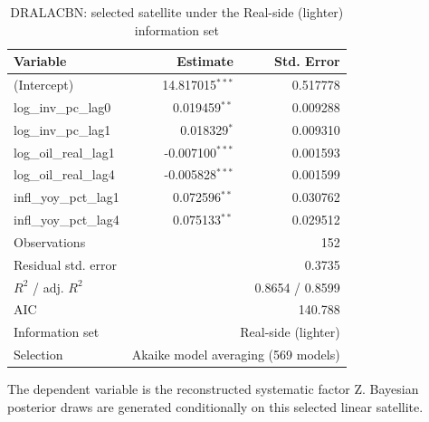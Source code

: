 \begin{table}[!htbp]
\centering
\caption{DRALACBN: selected satellite under the Real-side (lighter) information set}
\label{tab:dralacbn_real_side_lighter_satellite}
\begin{tabular}{lrr}
\toprule
Variable & Estimate & Std. Error \\
\midrule
(Intercept) & 14.817015$^{***}$ & 0.517778 \\
log_inv_pc_lag0 & 0.019459$^{**}$ & 0.009288 \\
log_inv_pc_lag1 & 0.018329$^{*}$ & 0.009310 \\
log_oil_real_lag1 & -0.007100$^{***}$ & 0.001593 \\
log_oil_real_lag4 & -0.005828$^{***}$ & 0.001599 \\
infl_yoy_pct_lag1 & 0.072596$^{**}$ & 0.030762 \\
infl_yoy_pct_lag4 & 0.075133$^{**}$ & 0.029512 \\
\midrule
Observations & \multicolumn{2}{r}{152} \\
Residual std. error & \multicolumn{2}{r}{0.3735} \\
$R^2$ / adj. $R^2$ & \multicolumn{2}{r}{0.8654 / 0.8599} \\
AIC & \multicolumn{2}{r}{140.788} \\
Information set & \multicolumn{2}{r}{Real-side (lighter)} \\
Selection & \multicolumn{2}{r}{Akaike model averaging (569 models)} \\
\bottomrule
\end{tabular}
\begin{tablenotes}
\small
\item The dependent variable is the reconstructed systematic factor Z. Bayesian posterior draws are generated conditionally on this selected linear satellite.
\end{tablenotes}
\end{table}
